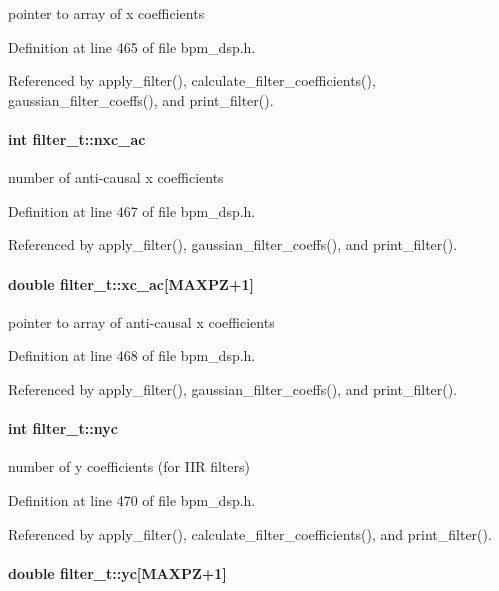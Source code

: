 pointer to array of x coefficients 

Definition at line 465 of file bpm\_\-dsp.h.

Referenced by apply\_\-filter(), calculate\_\-filter\_\-coefficients(), gaussian\_\-filter\_\-coeffs(), and print\_\-filter().
\paragraph[nxc\_\-ac]{\setlength{\rightskip}{0pt plus 5cm}int {\bf filter\_\-t::nxc\_\-ac}}\hfill\label{structfilter__t_92369adf50700705324f0ead36ec800c}


number of anti-causal x coefficients 

Definition at line 467 of file bpm\_\-dsp.h.

Referenced by apply\_\-filter(), gaussian\_\-filter\_\-coeffs(), and print\_\-filter().
\paragraph[xc\_\-ac]{\setlength{\rightskip}{0pt plus 5cm}double {\bf filter\_\-t::xc\_\-ac}[MAXPZ+1]}\hfill\label{structfilter__t_7918586bf5ed32660dabe328a1f2589f}


pointer to array of anti-causal x coefficients 

Definition at line 468 of file bpm\_\-dsp.h.

Referenced by apply\_\-filter(), gaussian\_\-filter\_\-coeffs(), and print\_\-filter().
\paragraph[nyc]{\setlength{\rightskip}{0pt plus 5cm}int {\bf filter\_\-t::nyc}}\hfill\label{structfilter__t_b67b5502d78fb69739317f7330d9bf19}


number of y coefficients (for IIR filters) 

Definition at line 470 of file bpm\_\-dsp.h.

Referenced by apply\_\-filter(), calculate\_\-filter\_\-coefficients(), and print\_\-filter().
\paragraph[yc]{\setlength{\rightskip}{0pt plus 5cm}double {\bf filter\_\-t::yc}[MAXPZ+1]}\hfill\label{structfilter__t_f90b9fd76e7e0bf377a17ea23ca589f0}


